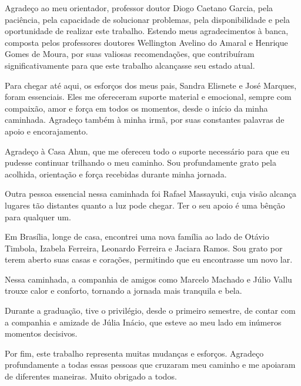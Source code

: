 \begin{agradecimentos}
    Agradeço ao meu orientador, professor doutor Diogo Caetano Garcia, pela paciência, pela capacidade de solucionar problemas, pela disponibilidade e pela oportunidade de realizar este trabalho. Estendo meus agradecimentos à banca, composta pelos professores doutores Wellington Avelino do Amaral e Henrique Gomes de Moura, por suas valiosas recomendações, que contribuíram significativamente para que este trabalho alcançasse seu estado atual.
    
    Para chegar até aqui, os esforços dos meus pais, Sandra Elisnete e José Marques, foram essenciais. Eles me ofereceram suporte material e emocional, sempre com compaixão, amor e força em todos os momentos, desde o início da minha caminhada. Agradeço também à minha irmã, por suas constantes palavras de apoio e encorajamento.

    Agradeço à Casa Ahun, que me ofereceu todo o suporte necessário para que eu pudesse continuar trilhando o meu caminho. Sou profundamente grato pela acolhida, orientação e força recebidas durante minha jornada.

    Outra pessoa essencial nessa caminhada foi Rafael Massayuki, cuja visão alcança lugares tão distantes quanto a luz pode chegar. Ter o seu apoio é uma bênção para qualquer um. 

    Em Brasília, longe de casa, encontrei uma nova família ao lado de Otávio Timbola, Izabela Ferreira, Leonardo Ferreira e Jaciara Ramos. Sou grato por terem aberto suas casas e corações, permitindo que eu encontrasse um novo lar.
    
    Nessa caminhada, a companhia de amigos como Marcelo Machado e Júlio Vallu trouxe calor e conforto, tornando a jornada mais tranquila e bela.

    Durante a graduação, tive o privilégio, desde o primeiro semestre, de contar com a companhia e amizade de Júlia Inácio, que esteve ao meu lado em inúmeros momentos decisivos.

    Por fim, este trabalho representa muitas mudanças e esforços. Agradeço profundamente a todas essas pessoas que cruzaram meu caminho e me apoiaram de diferentes maneiras. Muito obrigado a todos.

\end{agradecimentos}
